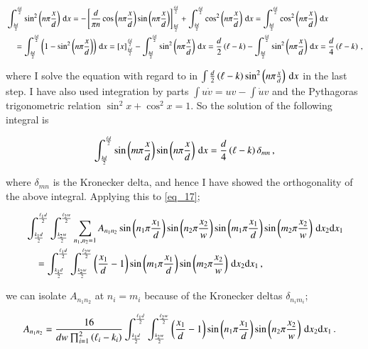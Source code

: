\documentclass[11pt,english,a4paper]{article}
\begin{document}
\begin{flushleft}
\begin{align*}
&\int_{\frac{k d}{2}}^{\frac{\ell d}{2}} \sin^2\left({n\pi\frac{x}{d}}\right)\,\mathrm{d}x 
= -\left[{ \frac{d}{\pi n}\cos\left({n\pi\frac{x}{d}}\right)\sin\left({n\pi\frac{x}{d}}\right)}\right]_{\frac{k d}{2}}^{\frac{\ell d}{2}} + \int_{\frac{k d}{2}}^{\frac{\ell d}{2}} \cos^2\left({n\pi\frac{x}{d}}\right)\,\mathrm{d}x
= \int_{\frac{k d}{2}}^{\frac{\ell d}{2}}  \cos^2\left({n\pi\frac{x}{d}}\right)\,\mathrm{d}x
\\ 
&\quad = \int_{\frac{k d}{2}}^{\frac{\ell d}{2}}  \left({1-\sin^2\left({n\pi\frac{x}{d}}\right)}\right)\,\mathrm{d}x 
= \left[{x}\right]_{\frac{k d}{2}}^{\frac{\ell d}{2}} - \int_{\frac{k d}{2}}^{\frac{\ell d}{2}}  \sin^2\left({n\pi\frac{x}{d}}\right)\,\mathrm{d}x 
= \frac{d}{2}\left({\ell-k}\right) - \int_{\frac{k d}{2}}^{\frac{\ell d}{2}}  \sin^2\left({n\pi\frac{x}{d}}\right)\,\mathrm{d}x 
= \frac{d}{4}\left({\ell-k}\right) \,,
\end{align*}

where I solve the equation with regard to in $\int\frac{d}{2}\left({\ell-k}\right) \sin^2\left({n\pi\frac{x}{d}}\right)\,\mathrm{d}x$ in the last step. I have also used integration by parts $\int u\dot{v} = uv - \int \dot{u}v$ and the Pythagoras trigonometric relation $\sin^2 x+ \cos^2 x = 1$. So the solution of the following integral is

\begin{align*}
\int_{\frac{k d}{2}}^{\frac{\ell d}{2}} \sin\left({m\pi\frac{x}{d}}\right)\sin\left({n\pi\frac{x}{d}}\right)\,\mathrm{d}x = \frac{d}{4}\left({\ell-k}\right)\delta_{mn}\,,
\end{align*}

where $\delta_{mn}$ is the Kronecker delta, and hence I have showed the orthogonality of the above integral. Applying this to \eqref{eq_17};

\begin{align*}
&\int_{\frac{k_1 d}{2}}^{\frac{\ell_1 d}{2}}\int_{\frac{k_2 w}{2}}^{\frac{\ell_2 w}{2}}  \sum_{n_1,n_2=1}A_{n_1 n_2} \sin\left({n_1\pi \frac{x_1}{d}}\right) \sin\left({n_2\pi \frac{x_2}{w}}\right)\sin\left({m_1\pi\frac{x_1}{d}}\right)\sin\left({m_2\pi\frac{x_2}{w}}\right)\,\mathrm{d}x_2\mathrm{d}x_1 
\\
& \quad = \int_{\frac{k_1 d}{2}}^{\frac{\ell_1 d}{2}}\int_{\frac{k_2 w}{2}}^{\frac{\ell_2 w}{2}} \left({\frac{x_1}{d}-1}\right)\sin\left({m_1\pi\frac{x_1}{d}}\right)\sin\left({m_2\pi\frac{x_2}{w}}\right)\,\mathrm{d}x_2\mathrm{d}x_1\,,
\end{align*}

we can isolate $A_{n_1 n_2}$ at $n_i=m_i$ because of the Kronecker deltas $\delta_{n_i m_i}$;

\begin{align*}
A_{n_1 n_2} &=  \frac{16}{dw\prod_{i=1}^2\left({\ell_i-k_i}\right)}\int_{\frac{k_1 d}{2}}^{\frac{\ell_1 d}{2}}\int_{\frac{k_2 w}{2}}^{\frac{\ell_2 w}{2}} \left({\frac{x_1}{d}-1}\right)\sin\left({n_1\pi\frac{x_1}{d}}\right)\sin\left({n_2\pi\frac{x_2}{w}}\right)\,\mathrm{d}x_2\mathrm{d}x_1 \,.
\end{align*}


\end{flushleft}
\end{document}
